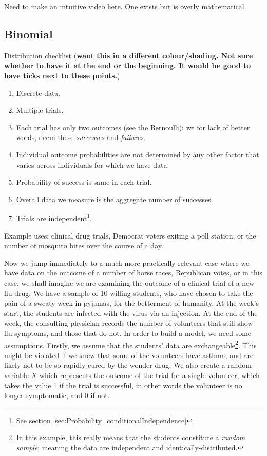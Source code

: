 \documentclass[11pt,fullpage]{book}
\begin{document}
 Need to make an intuitive video here. One exists but is overly mathematical.

\subsection{Binomial}\label{sec:Distributions_binomial}
Distribution checklist (\textbf{want this in a different colour/shading. Not sure whether to have it at the end or the beginning. It would be good to have ticks next to these points.})

\begin{enumerate} 
\item Discrete data.
\item Multiple trials.
\item Each trial has only two outcomes (see the Bernoulli): we for lack of better words, deem these \textit{successes} and \textit{failures}.
\item Individual outcome probabilities are not determined by any other factor that varies across individuals for which we have data.
\item Probability of success is same in each trial.
\item Overall data we measure is the aggregate number of successes. 
\item Trials are independent\footnote{See section \ref{sec:Probability_conditionalIndependence}}.
\end{enumerate}

Example uses: clinical drug trials, Democrat voters exiting a poll station, or the number of mosquito bites over the course of a day.

Now we jump immediately to a much more practically-relevant case where we have data on the outcome of a number of horse races, Republican votes, or in this case, we shall imagine we are examining the outcome of a clinical trial of a new flu drug. We have a sample of 10 willing students, who have chosen to take the pain of a sweaty week in pyjamas, for the betterment of humanity. At the week's start, the students are infected with the virus via an injection. At the end of the week, the consulting physician records the number of volunteers that still show flu symptoms, and those that do not. In order to build a model, we need some assumptions. Firstly, we assume that the students' data are exchangeable\footnote{In this example, this really means that the students constitute a \textit{random sample}; meaning the data are independent and identically-distributed.}. This might be violated if we knew that some of the volunteers have asthma, and are likely not to be so rapidly cured by the wonder drug. We also create a random variable $X$ which represents the outcome of the trial for a single volunteer, which takes the value 1 if the trial is successful, in other words the volunteer is no longer symptomatic, and 0 if not.
\end{document}
